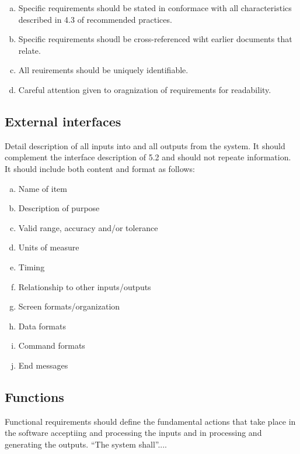 \documentclass[10pt]{article}
\begin{document}
\vspace{12pt}

     \begin{enumerate}[(a)]
     \item{Specific requirements should be stated in conformace with all characteristics described in 4.3 of recommended practices.}
     \item{Specific requirements shoudl be cross-referenced wiht earlier documents that relate.}
     \item{All reuirements should be uniquely identifiable.}
     \item{Careful attention given to oragnization of requirements for readability.}
     \end{enumerate}

     \subsection{External interfaces}
     Detail description of all inputs into and all outputs from the system. It should complement the interface description of 5.2 and should not repeate information. It should include both content and format as follows:
     
     \begin{enumerate}[(a)]
     \item{Name of item}
     \item{Description of purpose}
     \item{Valid range, accuracy and/or tolerance}
     \item{Units of measure}
     \item{Timing}
     \item{Relationship to other inputs/outputs}
     \item{Screen formats/organization}
     \item{Data formats}
     \item{Command formats}
     \item{End messages}
     \end{enumerate}

     \subsection{Functions}
     Functional requirements should define the fundamental actions that take place in the software acceptiing and processing the inputs and in processing and generating the outputs. ``The system shall''....
\end{document}
